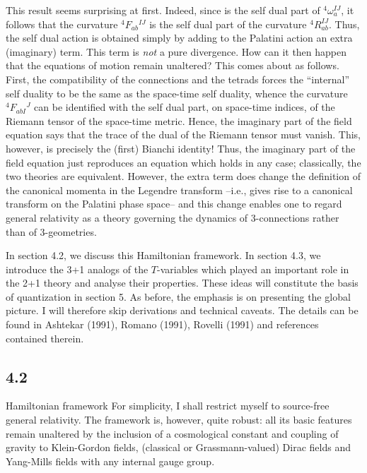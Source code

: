 This result seems surprising at first. Indeed, since \fA\- is the self dual
part of ${}^4\!\omega_a^{IJ}$, it follows that the curvature ${}^4F_{ab}
{}^{IJ}$ is the self dual part of the curvature ${}^4\!R_{ab}^{IJ}$. Thus,
the self dual action is obtained simply by adding to the Palatini action
an extra (imaginary) term. This term is {\it not} a pure divergence. How can
it then happen that the equations of motion remain unaltered? This comes
about as follows. First, the compatibility of the connections and the
tetrads forces the ``internal'' self duality to be the same as the
space-time self duality, whence the curvature ${}^4\!F_{abI}{}^J$ can be
identified with the self dual part, on space-time indices, of the Riemann
tensor of the space-time metric. Hence, the imaginary part of the field
equation says that the trace of the dual of the Riemann tensor must vanish.
This, however, is precisely the (first) Bianchi identity! Thus, the imaginary
part of the field equation just reproduces an equation which holds in any case;
classically, the two theories are equivalent. However, the extra term does
change the definition of the canonical momenta in the Legendre transform
--i.e., gives rise to a canonical transform on the Palatini phase space--
and this change enables one to regard general relativity as a theory governing
the dynamics of  3-connections rather than of 3-geometries.

In section 4.2, we discuss this Hamiltonian framework. In section 4.3, we
introduce the 3+1 analogs of the $T$-variables which played an important
role in the 2+1 theory and analyse their properties. These ideas will
constitute the basis of quantization in section 5. As before,
the emphasis is on presenting the global picture. I will therefore skip
derivations and technical caveats. The details can be found in Ashtekar
(1991), Romano (1991), Rovelli (1991) and references contained
therein.

\goodbreak
\subsection{4.2}{Hamiltonian framework}
%
For simplicity, I shall restrict myself to source-free general relativity.
The framework is, however, quite robust: all its basic features remain
unaltered by the inclusion of a cosmological constant and coupling of
gravity to Klein-Gordon fields, (classical or Grassmann-valued) Dirac fields
and Yang-Mills fields with any internal gauge group.

